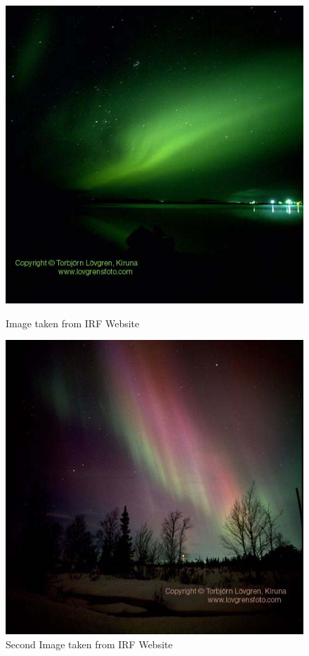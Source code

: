 \documentclass{article}
\begin{document}
\begin{figure}[ht]
\begin{minipage}[b]{0.5\linewidth}
\centering
\includegraphics[scale=1.8]{Figures/awowa1.jpg}
\caption{Image taken from IRF Website}
\label{fig:Awowa1}
\end{minipage}
\hspace{0.5cm}
\begin{minipage}[b]{0.5\linewidth}
\centering
\includegraphics[scale=1.8]{Figures/awowa2.jpg}
\caption{Second Image taken from IRF Website}
\label{fig:Awowa2}
\end{minipage}
\end{figure}
\end{document}
